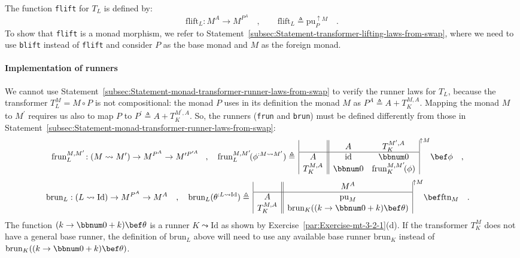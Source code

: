 The function \lstinline!flift! for $T_{L}$ is defined by:
\[
\text{flift}_{L}:M^{A}\rightarrow M^{P^{A}}\quad,\quad\quad\text{flift}_{L}\triangleq\text{pu}_{P}^{\uparrow M}\quad.
\]
To show that \lstinline!flift! is a monad morphism, we refer to Statement~\ref{subsec:Statement-transformer-lifting-laws-from-swap},
where we need to use \lstinline!blift! instead of \lstinline!flift!
and consider $P$ as the base monad and $M$ as the foreign monad.

\paragraph{Implementation of runners}

We cannot use Statement~\ref{subsec:Statement-monad-transformer-runner-laws-from-swap}
to verify the runner laws for $T_{L}$, because the transformer $T_{L}^{M}=M\circ P$
is not compositional: the monad $P$ uses in its definition the monad
$M$ as $P^{A}\triangleq A+T_{K}^{M,A}$. Mapping the monad $M$ to
$M^{\prime}$ requires us also to map $P$ to $P^{\prime}\triangleq A+T_{K}^{M^{\prime},A}$.
So, the runners (\lstinline!frun! and \lstinline!brun!) must be
defined differently from those in Statement~\ref{subsec:Statement-monad-transformer-runner-laws-from-swap}:
\begin{align*}
 & \text{frun}_{L}^{M,M^{\prime}}\!:(M\leadsto M^{\prime})\rightarrow M^{P^{A}}\rightarrow M^{\prime P^{\prime A}}\!\quad,\quad\text{frun}_{L}^{M,M^{\prime}}\!(\phi^{:M\leadsto M^{\prime}})\triangleq\,\begin{array}{|c||cc|}
 & A & T_{K}^{M^{\prime},A}\\
\hline A & \text{id} & \bbnum 0\\
T_{K}^{M,A} & \bbnum 0 & \text{frun}_{K}^{M,M^{\prime}}\!(\phi)
\end{array}^{\uparrow M}\bef\phi\quad,
\end{align*}
\begin{align*}
 & \text{brun}_{L}:(L\leadsto\text{Id})\rightarrow M^{P^{A}}\rightarrow M^{A}\quad,\quad\text{brun}_{L}(\theta^{:L\leadsto\text{Id}})\triangleq\,\begin{array}{|c||c|}
 & M^{A}\\
\hline A & \text{pu}_{M}\\
T_{K}^{M,A} & \text{brun}_{K}((k\rightarrow\bbnum 0+k)\bef\theta)
\end{array}^{\uparrow M}\bef\text{ftn}_{M}\quad.
\end{align*}
The function $(k\rightarrow\bbnum 0+k)\bef\theta$ is a runner $K\leadsto\text{Id}$
as shown by Exercise~\ref{par:Exercise-mt-3-2-1}(d). If the transformer
$T_{K}^{M}$ does not have a general base runner, the definition of
$\text{brun}_{L}$ above will need to use any available base runner
$\text{brun}_{K}$ instead of $\text{brun}_{K}((k\rightarrow\bbnum 0+k)\bef\theta)$.

